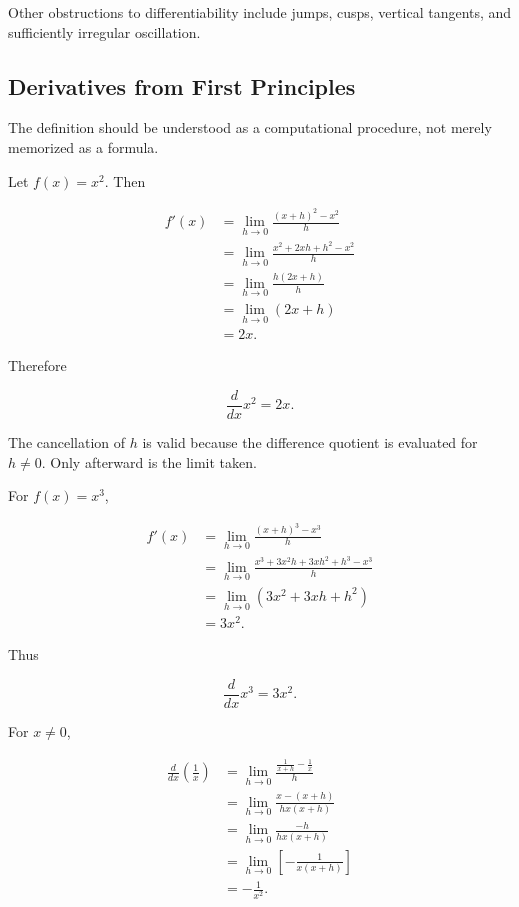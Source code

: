 Other obstructions to differentiability include jumps, cusps, vertical tangents, and sufficiently irregular oscillation.

\subsection{Derivatives from First Principles}

The definition should be understood as a computational procedure, not merely memorized as a formula.


Let $f(x)=x^2$. Then

\begin{align*}
f'(x)
&=
\lim_{h\to0}\frac{(x+h)^2-x^2}{h}\\
&=
\lim_{h\to0}\frac{x^2+2xh+h^2-x^2}{h}\\
&=
\lim_{h\to0}\frac{h(2x+h)}{h}\\
&=
\lim_{h\to0}(2x+h)\\
&=2x.
\end{align*}

Therefore

\[
\boxed{\frac{d}{dx}x^2=2x.}
\]

The cancellation of $h$ is valid because the difference quotient is evaluated for $h\neq0$. Only afterward is the limit taken.


For $f(x)=x^3$,

\begin{align*}
f'(x)
&=
\lim_{h\to0}\frac{(x+h)^3-x^3}{h}\\
&=
\lim_{h\to0}\frac{x^3+3x^2h+3xh^2+h^3-x^3}{h}\\
&=
\lim_{h\to0}\left(3x^2+3xh+h^2\right)\\
&=3x^2.
\end{align*}

Thus

\[
\boxed{\frac{d}{dx}x^3=3x^2.}
\]


For $x\neq0$,

\begin{align*}
\frac{d}{dx}\left(\frac1x\right)
&=
\lim_{h\to0}
\frac{\frac{1}{x+h}-\frac1x}{h}\\
&=
\lim_{h\to0}
\frac{x-(x+h)}{hx(x+h)}\\
&=
\lim_{h\to0}
\frac{-h}{hx(x+h)}\\
&=
\lim_{h\to0}
\left[-\frac{1}{x(x+h)}\right]\\
&=-\frac1{x^2}.
\end{align*}

